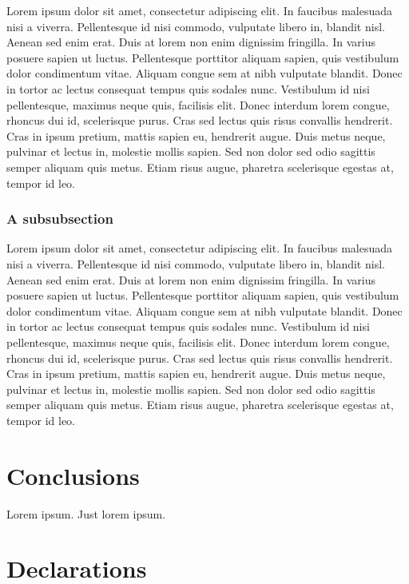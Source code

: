 \documentclass[a4paper,num-refs,numbers,sort&compress]{de-rse}
\begin{document}
Lorem ipsum dolor sit amet, consectetur adipiscing elit. In faucibus malesuada nisi a viverra. Pellentesque id nisi commodo, vulputate libero in, blandit nisl. Aenean sed enim erat. Duis at lorem non enim dignissim fringilla. In varius posuere sapien ut luctus. Pellentesque porttitor aliquam sapien, quis vestibulum dolor condimentum vitae. Aliquam congue sem at nibh vulputate blandit. Donec in tortor ac lectus consequat tempus quis sodales nunc. Vestibulum id nisi pellentesque, maximus neque quis, facilisis elit. Donec interdum lorem congue, rhoncus dui id, scelerisque purus. Cras sed lectus quis risus convallis hendrerit. Cras in ipsum pretium, mattis sapien eu, hendrerit augue. Duis metus neque, pulvinar et lectus in, molestie mollis sapien. Sed non dolor sed odio sagittis semper aliquam quis metus. Etiam risus augue, pharetra scelerisque egestas at, tempor id leo.

\subsubsection[]{A subsubsection}

Lorem ipsum dolor sit amet, consectetur adipiscing elit. In faucibus malesuada nisi a viverra. Pellentesque id nisi commodo, vulputate libero in, blandit nisl. Aenean sed enim erat. Duis at lorem non enim dignissim fringilla. In varius posuere sapien ut luctus. Pellentesque porttitor aliquam sapien, quis vestibulum dolor condimentum vitae. Aliquam congue sem at nibh vulputate blandit. Donec in tortor ac lectus consequat tempus quis sodales nunc. Vestibulum id nisi pellentesque, maximus neque quis, facilisis elit. Donec interdum lorem congue, rhoncus dui id, scelerisque purus. Cras sed lectus quis risus convallis hendrerit. Cras in ipsum pretium, mattis sapien eu, hendrerit augue. Duis metus neque, pulvinar et lectus in, molestie mollis sapien. Sed non dolor sed odio sagittis semper aliquam quis metus. Etiam risus augue, pharetra scelerisque egestas at, tempor id leo.


\section{Conclusions}
Lorem ipsum. Just lorem ipsum.

\section{Declarations}
\end{document}

